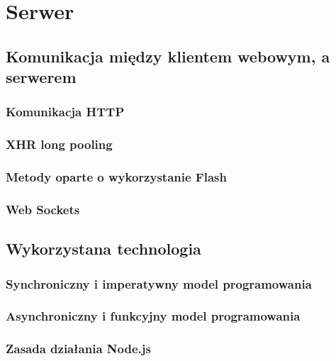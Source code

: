 \section{Serwer}

\subsection{Komunikacja między klientem webowym, a serwerem}

\subsubsection{Komunikacja HTTP}

\subsubsection{XHR long pooling}

\subsubsection{Metody oparte o wykorzystanie Flash}

\subsubsection{Web Sockets}

\subsection{Wykorzystana technologia}

\subsubsection{Synchroniczny i imperatywny model programowania}

\subsubsection{Asynchroniczny i funkcyjny model programowania}

\subsubsection{Zasada działania Node.js}
